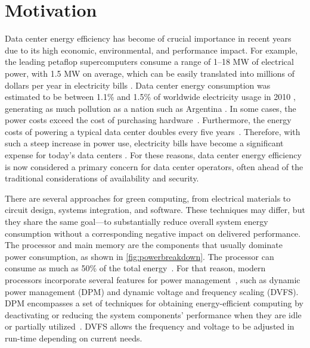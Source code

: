 
\section{Motivation} \label{sec:motivation}
Data center energy efficiency has become of crucial importance in recent years due to its high economic, environmental, and performance impact. For example, the leading petaflop supercomputers consume a range of 1–18 MW of electrical power, with 1.5 MW on average, which can be easily translated into millions of dollars per year in electricity bills \cite{Group2012HandbookSahni}.
Data center energy consumption was estimated to be between 1.1\% and 1.5\% of worldwide electricity usage in 2010 \cite{Dayarathna2016DataSurvey,Corcoran2017EmergingICT}, generating as much pollution as a nation such as Argentina  \cite{Mathew2012Energy-awareNetworks}.
In some cases, the power costs exceed the cost of purchasing hardware~\cite{Rivoire2007ModelsOptimizations}.
Furthermore, the energy costs of powering a typical data center doubles every five years~\cite{Buyya2013Introduction}.
Therefore, with such a steep increase in power use, electricity bills have become a significant expense for today's data centers \cite{Poess2008EnergyCenters,Gao2013QualityCenters}. 
For these reasons, data center energy efficiency is now considered a primary concern for data center operators, often ahead of the traditional considerations of availability and security.

There are several approaches for green computing, from electrical materials to circuit design, systems integration, and software. These techniques may differ, but they share the same goal---to substantially reduce overall system energy consumption without a corresponding negative impact on delivered performance.
The processor and main memory are  the components that usually dominate power consumption, as shown in \cref{fig:powerbreakdown}.
The processor can consume as much as 50\% of the total energy~\cite{Fan2007PowerComputer, Barroso2007TheComputing, Malladi2012TowardsDRAM}. For that reason, modern processors incorporate several features for power management~\cite{Rotem2012Power-managementBridge, Brown2005ACPILinux, Hackenberg2015AnProcessor, Intel20200thLake}, such as dynamic power management (DPM) and dynamic voltage and frequency scaling (DVFS). 
DPM encompasses a set of techniques for obtaining energy-efficient computing by deactivating or reducing the system components' performance when they are idle or partially utilized~\mbox{\cite{Shuja2012Energy-efficientCenters, Benini2000AManagement}}.
DVFS allows the frequency and voltage to be adjusted in run-time depending on current needs.


